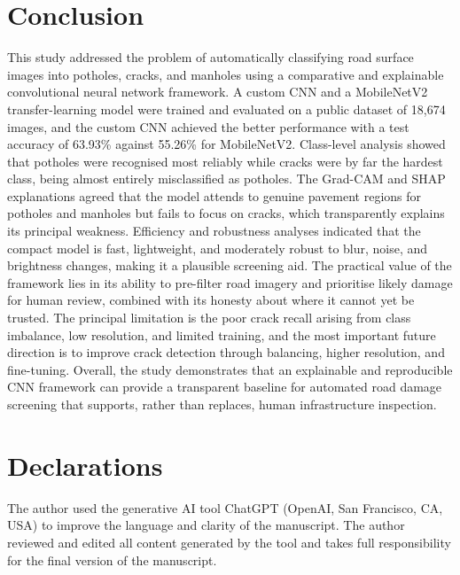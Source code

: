 \documentclass[preprint,12pt]{elsarticle}
\begin{document}
\section{Conclusion}
\label{sec:conclusion}

This study addressed the problem of automatically classifying road surface images into potholes, cracks, and manholes using a comparative and explainable convolutional neural network framework.
A custom CNN and a MobileNetV2 transfer-learning model were trained and evaluated on a public dataset of 18{,}674 images, and the custom CNN achieved the better performance with a test accuracy of 63.93\% against 55.26\% for MobileNetV2.
Class-level analysis showed that potholes were recognised most reliably while cracks were by far the hardest class, being almost entirely misclassified as potholes.
The Grad-CAM and SHAP explanations agreed that the model attends to genuine pavement regions for potholes and manholes but fails to focus on cracks, which transparently explains its principal weakness.
Efficiency and robustness analyses indicated that the compact model is fast, lightweight, and moderately robust to blur, noise, and brightness changes, making it a plausible screening aid.
The practical value of the framework lies in its ability to pre-filter road imagery and prioritise likely damage for human review, combined with its honesty about where it cannot yet be trusted.
The principal limitation is the poor crack recall arising from class imbalance, low resolution, and limited training, and the most important future direction is to improve crack detection through balancing, higher resolution, and fine-tuning.
Overall, the study demonstrates that an explainable and reproducible CNN framework can provide a transparent baseline for automated road damage screening that supports, rather than replaces, human infrastructure inspection.

\section*{Declarations}

The author used the generative AI tool ChatGPT (OpenAI, San Francisco, CA, USA) to improve the language and clarity of the manuscript.
The author reviewed and edited all content generated by the tool and takes full responsibility for the final version of the manuscript.



\end{document}
